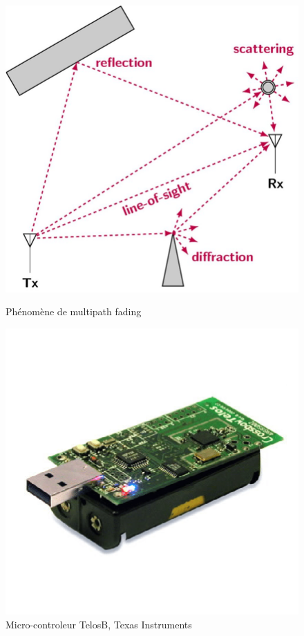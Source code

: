 \documentclass[]{report}
\begin{document}
\newpage

\begin{figure}[!ht]
	\centering
	\begin{minipage}{0.43\textwidth}
		\centering
		\includegraphics[width=\textwidth]{multipath}
		\caption{Phénomène de multipath fading\cite{multipath}}
		\label{fig:multipath}
	\end{minipage}\hfill
	\begin{minipage}{0.43\textwidth}
		\centering
		\includegraphics[width=\textwidth]{TelosB}
		\caption{Micro-controleur TelosB, Texas Instruments \cite{telosb}}
		\label{fig:telosb}
	\end{minipage}	
\end{figure}
\end{document}
